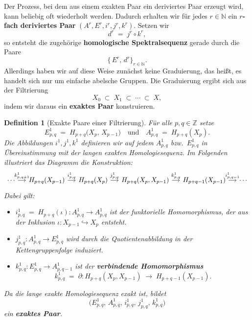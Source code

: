 \documentclass[12pt]{article}
\numberwithin{conj}{section}
\newtheorem{definition}[conj]{Definition}
\newcommand{\Z}{\mathbb{Z}}
\begin{document}
    Der Prozess, bei dem aus einem exakten Paar ein deriviertes Paar erzeugt wird,
    kann beliebig oft wiederholt werden. Dadurch erhalten wir für jedes
    $r \in \mathbb{N}$ ein \textbf{$r$-fach deriviertes Paar} $(A^{r}, E^{r}, i^{r}
    , j^{r}, k^{r})$. Setzen wir
    \[
        d^{r} \;=\; j^{r} \circ k^{r},
    \]
    so entsteht die zugehörige \textbf{homologische Spektralsequenz} gerade durch die
    Paare
    \[
        \{\,E^{r},\, d^{r}\}_{r \in \mathbb{N}}.
    \]
    Allerdings haben wir auf diese Weise zunächst keine Graduierung, das heißt, es
    handelt sich nur um einfache abelsche Gruppen. Die Graduierung ergibt sich aus
    der Filtrierung
    \[
        X_{0} \;\subset\; X_{1} \;\subset\; \cdots \;\subset\; X,
    \]
    indem wir daraus ein \textbf{exaktes Paar} konstruieren.

    \begin{definition}[Exakte Paare einer Filtrierung]
        \label{exaktFiltration} Für alle $p,q \in \Z$ setze
        \[
            E^{1}_{p,q}\;=\; H_{p+q}\bigl(X_{p},\,X_{p-1}\bigr) \quad\text{und}\quad A^{1}
            _{p,q}\;=\; H_{p+q}(X_{p}).
        \]
        Die Abbildungen $i^{1}, j^{1}, k^{1}$ definieren wir auf jedem $A^{1}_{p,q}$
        bzw.\ $E^{1}_{p,q}$ in Übereinstimmung mit der langen exakten
        Homologiesequenz. Im Folgenden illustriert das Diagramm die Konstruktion:
        \[\begin{tikzcd}[sep=small]
            \cdots & {H_{p+q}(X_{p-1})} & {H_{p+q}(X_{p})} & {H_{p+q}(X_{p},X_{p-1})} & {H_{p+q-1}(X_{p-1})} & \cdots
            \arrow["{k^1_{p,q+1}}", from=1-1, to=1-2]
            \arrow["{i^1_{p,q}}", from=1-2, to=1-3]
            \arrow["{j^1_{p,q}}", from=1-3, to=1-4]
            \arrow["{k^1_{p,q}}", from=1-4, to=1-5]
            \arrow["{i^1_{p,q-1}}", from=1-5, to=1-6]
        \end{tikzcd}\]
        Dabei gilt:
        \begin{itemize}[nolistsep]
            \item $i^{1}_{p,q}\;=\; H_{p+q}(\iota) : A^{1}_{p,q}\to A^{1}_{p,q}$ ist der
                funktorielle Homomorphismus, der aus der Inklusion
                $\iota: X_{p-1}\hookrightarrow X_{p}$ entsteht.

            \item $j^{1}_{p,q}: A^{1}_{p,q}\to E^{1}_{p,q}$ wird durch die Quotientenabbildung
                in der Kettengruppenfolge induziert.

            \item $k^{1}_{p,q}: E^{1}_{p,q}\to A^{1}_{p,q-1}$ ist der \textbf{verbindende
                Homomorphismus}
                \[
                    k^{1}_{p,q}\;=\; \partial : H_{p+q}(X_{p},X_{p-1}) \;\longrightarrow\;
                    H_{p+q-1}(X_{p-1}).
                \]
        \end{itemize}
        Da die lange exakte Homologiesequenz exakt ist, bildet
        \[
            \bigl( E^{1}_{p,q},\,A^{1}_{p,q},\,i^{1}_{p,q},\,j^{1}_{p,q},\,k^{1}_{p,q}\bigr
            )
        \]
        ein \textbf{exaktes Paar}.
    \end{definition}
\end{document}
